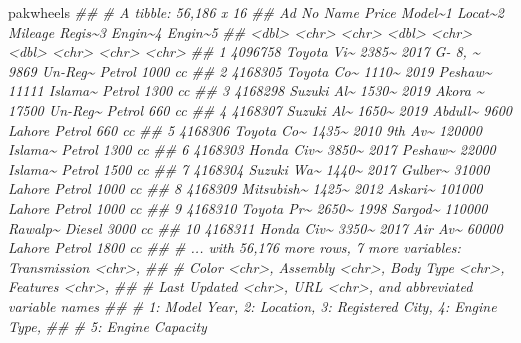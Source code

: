 \documentclass[
  letterpaper,
  DIV=11,
  numbers=noendperiod]{scrartcl}
\newenvironment{Shaded}{\begin{snugshade}}{\end{snugshade}}
\newcommand{\DocumentationTok}[1]{\textcolor[rgb]{0.37,0.37,0.37}{\textit{#1}}}
\newcommand{\NormalTok}[1]{\textcolor[rgb]{0.00,0.23,0.31}{#1}}
\begin{document}
\begin{Shaded}
\begin{Highlighting}[]
\NormalTok{pakwheels}
\DocumentationTok{\#\# \# A tibble: 56,186 x 16}
\DocumentationTok{\#\#    \textasciigrave{}Ad No\textasciigrave{} Name       Price Model\textasciitilde{}1 Locat\textasciitilde{}2 Mileage Regis\textasciitilde{}3 Engin\textasciitilde{}4 Engin\textasciitilde{}5}
\DocumentationTok{\#\#      \textless{}dbl\textgreater{} \textless{}chr\textgreater{}      \textless{}chr\textgreater{}   \textless{}dbl\textgreater{} \textless{}chr\textgreater{}     \textless{}dbl\textgreater{} \textless{}chr\textgreater{}   \textless{}chr\textgreater{}   \textless{}chr\textgreater{}  }
\DocumentationTok{\#\#  1 4096758 Toyota Vi\textasciitilde{} 2385\textasciitilde{}    2017 G{-} 8, \textasciitilde{}    9869 Un{-}Reg\textasciitilde{} Petrol  1000 cc}
\DocumentationTok{\#\#  2 4168305 Toyota Co\textasciitilde{} 1110\textasciitilde{}    2019 Peshaw\textasciitilde{}   11111 Islama\textasciitilde{} Petrol  1300 cc}
\DocumentationTok{\#\#  3 4168298 Suzuki Al\textasciitilde{} 1530\textasciitilde{}    2019 Akora \textasciitilde{}   17500 Un{-}Reg\textasciitilde{} Petrol  660 cc }
\DocumentationTok{\#\#  4 4168307 Suzuki Al\textasciitilde{} 1650\textasciitilde{}    2019 Abdull\textasciitilde{}    9600 Lahore  Petrol  660 cc }
\DocumentationTok{\#\#  5 4168306 Toyota Co\textasciitilde{} 1435\textasciitilde{}    2010 9th Av\textasciitilde{}  120000 Islama\textasciitilde{} Petrol  1300 cc}
\DocumentationTok{\#\#  6 4168303 Honda Civ\textasciitilde{} 3850\textasciitilde{}    2017 Peshaw\textasciitilde{}   22000 Islama\textasciitilde{} Petrol  1500 cc}
\DocumentationTok{\#\#  7 4168304 Suzuki Wa\textasciitilde{} 1440\textasciitilde{}    2017 Gulber\textasciitilde{}   31000 Lahore  Petrol  1000 cc}
\DocumentationTok{\#\#  8 4168309 Mitsubish\textasciitilde{} 1425\textasciitilde{}    2012 Askari\textasciitilde{}  101000 Lahore  Petrol  1000 cc}
\DocumentationTok{\#\#  9 4168310 Toyota Pr\textasciitilde{} 2650\textasciitilde{}    1998 Sargod\textasciitilde{}  110000 Rawalp\textasciitilde{} Diesel  3000 cc}
\DocumentationTok{\#\# 10 4168311 Honda Civ\textasciitilde{} 3350\textasciitilde{}    2017 Air Av\textasciitilde{}   60000 Lahore  Petrol  1800 cc}
\DocumentationTok{\#\# \# ... with 56,176 more rows, 7 more variables: Transmission \textless{}chr\textgreater{},}
\DocumentationTok{\#\# \#   Color \textless{}chr\textgreater{}, Assembly \textless{}chr\textgreater{}, \textasciigrave{}Body Type\textasciigrave{} \textless{}chr\textgreater{}, Features \textless{}chr\textgreater{},}
\DocumentationTok{\#\# \#   \textasciigrave{}Last Updated\textasciigrave{} \textless{}chr\textgreater{}, URL \textless{}chr\textgreater{}, and abbreviated variable names}
\DocumentationTok{\#\# \#   1: \textasciigrave{}Model Year\textasciigrave{}, 2: Location, 3: \textasciigrave{}Registered City\textasciigrave{}, 4: \textasciigrave{}Engine Type\textasciigrave{},}
\DocumentationTok{\#\# \#   5: \textasciigrave{}Engine Capacity\textasciigrave{}}
\end{Highlighting}
\end{Shaded}
\end{document}
